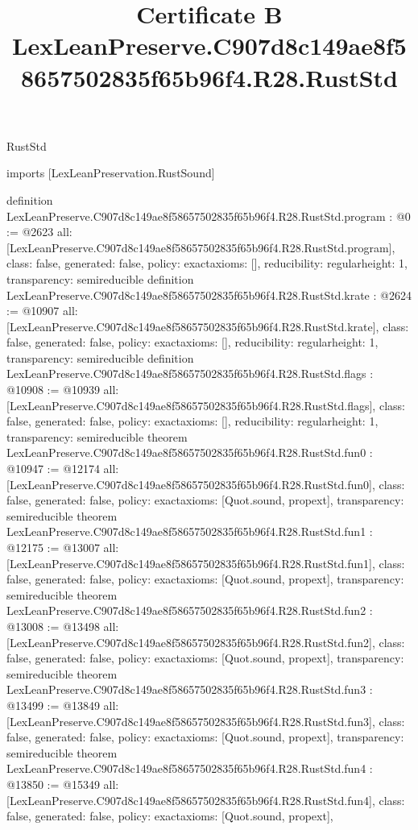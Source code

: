 \begin{lexlean}{RustStd}
\title{Certificate B LexLeanPreserve.C907d8c149ae8f58657502835f65b96f4.R28.RustStd}
\begin{coremodule}
imports [LexLeanPreservation.RustSound]

definition LexLeanPreserve.C907d8c149ae8f58657502835f65b96f4.R28.RustStd.program : @0 := @2623 {
  all: [LexLeanPreserve.C907d8c149ae8f58657502835f65b96f4.R28.RustStd.program],
  class: false,
  generated: false,
  policy: exact{axioms: []},
  reducibility: regular{height: 1},
  transparency: semireducible
}
definition LexLeanPreserve.C907d8c149ae8f58657502835f65b96f4.R28.RustStd.krate : @2624 := @10907 {
  all: [LexLeanPreserve.C907d8c149ae8f58657502835f65b96f4.R28.RustStd.krate],
  class: false,
  generated: false,
  policy: exact{axioms: []},
  reducibility: regular{height: 1},
  transparency: semireducible
}
definition LexLeanPreserve.C907d8c149ae8f58657502835f65b96f4.R28.RustStd.flags : @10908 := @10939 {
  all: [LexLeanPreserve.C907d8c149ae8f58657502835f65b96f4.R28.RustStd.flags],
  class: false,
  generated: false,
  policy: exact{axioms: []},
  reducibility: regular{height: 1},
  transparency: semireducible
}
theorem LexLeanPreserve.C907d8c149ae8f58657502835f65b96f4.R28.RustStd.fun0 : @10947 := @12174 {
  all: [LexLeanPreserve.C907d8c149ae8f58657502835f65b96f4.R28.RustStd.fun0],
  class: false,
  generated: false,
  policy: exact{axioms: [Quot.sound, propext]},
  transparency: semireducible
}
theorem LexLeanPreserve.C907d8c149ae8f58657502835f65b96f4.R28.RustStd.fun1 : @12175 := @13007 {
  all: [LexLeanPreserve.C907d8c149ae8f58657502835f65b96f4.R28.RustStd.fun1],
  class: false,
  generated: false,
  policy: exact{axioms: [Quot.sound, propext]},
  transparency: semireducible
}
theorem LexLeanPreserve.C907d8c149ae8f58657502835f65b96f4.R28.RustStd.fun2 : @13008 := @13498 {
  all: [LexLeanPreserve.C907d8c149ae8f58657502835f65b96f4.R28.RustStd.fun2],
  class: false,
  generated: false,
  policy: exact{axioms: [Quot.sound, propext]},
  transparency: semireducible
}
theorem LexLeanPreserve.C907d8c149ae8f58657502835f65b96f4.R28.RustStd.fun3 : @13499 := @13849 {
  all: [LexLeanPreserve.C907d8c149ae8f58657502835f65b96f4.R28.RustStd.fun3],
  class: false,
  generated: false,
  policy: exact{axioms: [Quot.sound, propext]},
  transparency: semireducible
}
theorem LexLeanPreserve.C907d8c149ae8f58657502835f65b96f4.R28.RustStd.fun4 : @13850 := @15349 {
  all: [LexLeanPreserve.C907d8c149ae8f58657502835f65b96f4.R28.RustStd.fun4],
  class: false,
  generated: false,
  policy: exact{axioms: [Quot.sound, propext]},
}
\end{coremodule}
\end{lexlean}

